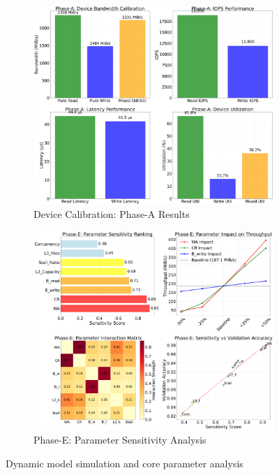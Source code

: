 \documentclass[11pt]{article}
\begin{document}
\begin{figure}[H]
\centering
\begin{subfigure}{0.48\textwidth}
\centering
\includegraphics[width=\textwidth]{experiments/2025-09-05/device_calibration_analysis.png}
\caption{Device Calibration: Phase-A Results}
\label{fig:model_simulation}
\end{subfigure}
\hfill
\begin{subfigure}{0.48\textwidth}
\centering
\includegraphics[width=\textwidth]{experiments/2025-09-05/phase_e_sensitivity_analysis.png}
\caption{Phase-E: Parameter Sensitivity Analysis}
\label{fig:core_parameters}
\end{subfigure}
\caption{Dynamic model simulation and core parameter analysis}
\end{figure}
\end{document}
